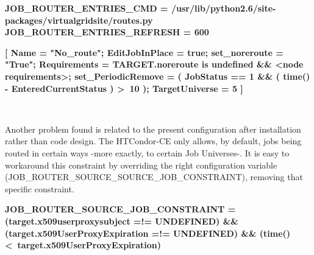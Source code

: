 \documentclass[a4paper]{jpconf}
\begin{document}
\begin{center}
    \colorbox{htcondorbox}{
        \begin{minipage}{\textwidth}
        \small
            \bf{JOB\_ROUTER\_ENTRIES\_CMD = \newline 
                \hspace*{1cm}/usr/lib/python2.6/site-packages/virtualgridsite/routes.py \newline
                JOB\_ROUTER\_ENTRIES\_REFRESH = 600
            }
        \end{minipage}
    }
\end{center}

\begin{center}
    \colorbox{htcondorbox}{
        \begin{minipage}{\textwidth}
        \small
            \bf{[
                 Name = "No\_route";  \newline
                 EditJobInPlace = true; \newline
                 set\_noreroute = "True"; \newline
                 Requirements = TARGET.noreroute is undefined \&\& \textless node requirements\textgreater;  \newline
                 set\_PeriodicRemove = ( JobStatus == 1 \&\& ( time() - EnteredCurrentStatus ) \textgreater \ 10 ); \newline
                 TargetUniverse = 5 \newline
                 ]
            }
        \end{minipage}
    }
\end{center}

~

Another problem found is related to the present configuration after installation rather than code design. 
The HTCondor-CE only allows, by default, jobs being routed in certain ways -more exactly, to certain Job Universes-.
It is easy to workaround this constraint by overriding the right configuration
variable (JOB\_ROUTER\_SOURCE\_SOURCE\_JOB\_CONSTRAINT), removing that specific
constraint.

\begin{center}
    \colorbox{htcondorbox}{
        \begin{minipage}{\textwidth}
        \small
            \bf{JOB\_ROUTER\_SOURCE\_JOB\_CONSTRAINT = \newline
               (target.x509userproxysubject =!= UNDEFINED) \&\& \newline
               (target.x509UserProxyExpiration =!= UNDEFINED) \&\& \newline
               (time() \textless \  target.x509UserProxyExpiration)
            }
        \end{minipage}
    }
\end{center}
\end{document}
